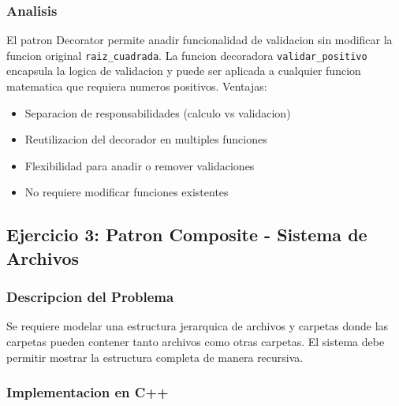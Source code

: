 \documentclass[11pt,a4paper]{article}
\begin{document}
\subsubsection{Analisis}

El patron Decorator permite anadir funcionalidad de validacion sin modificar la funcion original \texttt{raiz\_cuadrada}. La funcion decoradora \texttt{validar\_positivo} encapsula la logica de validacion y puede ser aplicada a cualquier funcion matematica que requiera numeros positivos. Ventajas:

\begin{itemize}
    \item Separacion de responsabilidades (calculo vs validacion)
    \item Reutilizacion del decorador en multiples funciones
    \item Flexibilidad para anadir o remover validaciones
    \item No requiere modificar funciones existentes
\end{itemize}

\subsection{Ejercicio 3: Patron Composite - Sistema de Archivos}

\subsubsection{Descripcion del Problema}

Se requiere modelar una estructura jerarquica de archivos y carpetas donde las carpetas pueden contener tanto archivos como otras carpetas. El sistema debe permitir mostrar la estructura completa de manera recursiva.

\subsubsection{Implementacion en C++}
\end{document}
